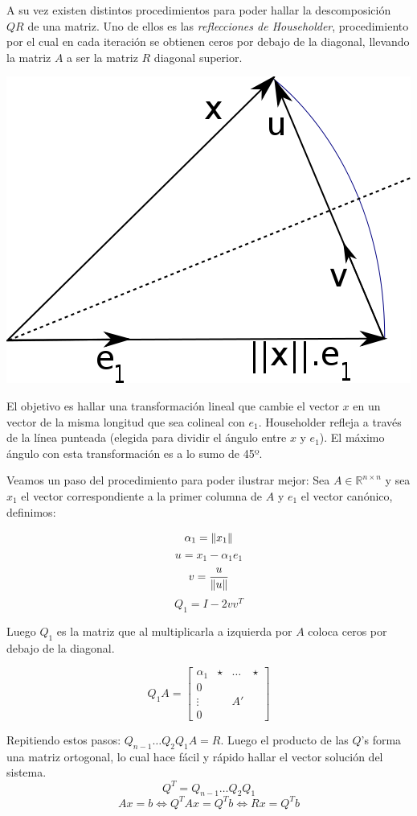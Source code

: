 A su vez existen distintos procedimientos para poder hallar la descomposición $QR$ de una matriz.
Uno de ellos es las \textit{reflecciones de Householder}, procedimiento por el cual en cada iteración se obtienen ceros por debajo de la diagonal, llevando la matriz $A$ a ser la matriz $R$ diagonal superior.

\begin{center}
  \centering
  \includegraphics[scale=0.5]{./archivos/graficos/householder.png}
\end{center}

El objetivo es hallar una transformación lineal que cambie el vector $x$ en un vector de la misma longitud que sea colineal con $e_1$. Householder refleja a través de la línea punteada (elegida para dividir el ángulo entre $x$ y $e_1$). El máximo ángulo con esta transformación es a lo sumo de 45º.

Veamos un paso del procedimiento para poder ilustrar mejor: Sea $A \in \mathbb{R}^{n \times n}$ y sea $x_1$ el vector correspondiente a la primer columna de $A$ y $e_1$ el vector canónico, definimos:

\[
  \alpha_1 = \left\|x_1\right\|
\]
\[
  u = x_1 - \alpha_1 e_1
\]
\[
  v = \frac{u}{\left\|u\right\|}
\]
\[
  Q_1 = I - 2vv^{T}
\]

Luego $Q_1$ es la matriz que al multiplicarla a izquierda por $A$ coloca ceros por debajo de la diagonal.

\[
  Q_1A = \begin{bmatrix}
   \alpha_1&\star&\dots&\star\\
      0    &     &     &    \\
   \vdots  &     &  A' &    \\
      0    &     &     & \end{bmatrix}
\]

Repitiendo estos pasos: $Q_{n - 1} \dots Q_2Q_1A = R$. Luego el producto de las $Q$'s forma una matriz ortogonal, lo cual hace fácil y rápido hallar el vector solución del sistema.
\[
  Q^T = Q_{n - 1} \dots Q_2Q_1
\]
\[
  Ax = b \iff Q^TAx = Q^Tb \iff Rx = Q^Tb
\]

